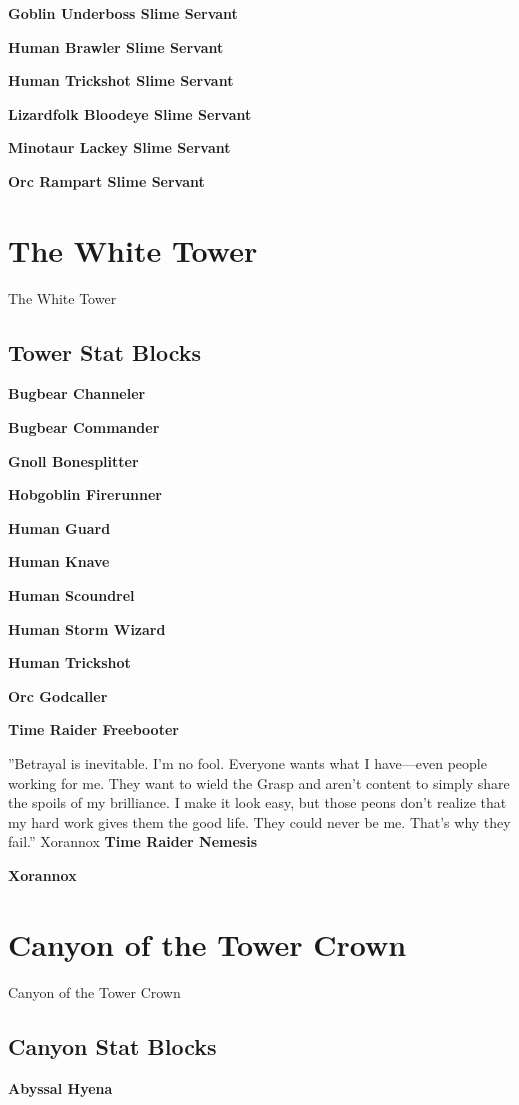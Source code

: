 \documentclass[10pt,a4paper,twoside,bg=print,twocolumn,openany,nodeprecatedcode]{dndbook}
\begin{document}
\textbf{Goblin Underboss Slime Servant}

\textbf{Human Brawler Slime Servant}

\textbf{Human Trickshot Slime Servant}

\textbf{Lizardfolk Bloodeye Slime Servant}

\textbf{Minotaur Lackey Slime Servant}

\textbf{Orc Rampart Slime Servant}

\chapter{The White Tower}
The White Tower

\section{Tower Stat Blocks}
\textbf{Bugbear Channeler}

\textbf{Bugbear Commander}

\textbf{Gnoll Bonesplitter}

\textbf{Hobgoblin Firerunner}

\textbf{Human Guard}

\textbf{Human Knave}

\textbf{Human Scoundrel}

\textbf{Human Storm Wizard}

\textbf{Human Trickshot}

\textbf{Orc Godcaller}

\textbf{Time Raider Freebooter}

\DndQuote%
{}
{''Betrayal is inevitable. I'm no fool. Everyone wants what I have—even people working for me. They want to wield the Grasp and aren't content to simply share the spoils of my brilliance. I make it look easy, but those peons don't realize that my hard work gives them the good life. They could never be me. That's why they fail.''}
{Xorannox}
\textbf{Time Raider Nemesis}

\textbf{Xorannox}

\chapter{Canyon of the Tower Crown}
Canyon of the Tower Crown

\section{Canyon Stat Blocks}
\textbf{Abyssal Hyena}
\end{document}
